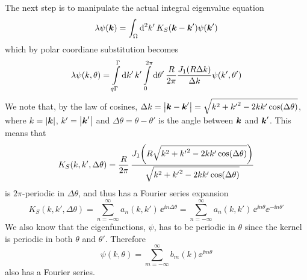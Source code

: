 \documentclass[11pt,a4paper, 
swedish, english %
]{article}
\begin{document}
The next step is to manipulate the actual integral eigenvalue equation
\begin{equation}
\lambda \psi(\vb*k) = \oldint_\Omega \rd^2k'\,
K_S(\vb*k-\vb*k')\psi(\vb*k')
\end{equation}
which by polar coordiane substitution becomes
\begin{equation}\label{eq:eigint-pol}
\lambda\psi(k, \theta) =
\int_{q\Gamma}^\Gamma\rd{k'}\,k'
\int_{0}^{2\pi}\rd\theta'\,\frac{R}{2\pi}
\frac{J_1(R\Delta{k})}{\Delta{k}} \psi(k',\theta')
\end{equation}
We note that, by the law of cosines, 
$\Delta{k}=\abs{\vb*k-\vb*k'}=\sqrt{k^2+{k'}^2-2kk'\cos(\Delta\theta)}$, 
where $k=\abs{\vb*k}$, $k'=\abs{\vb*k'}$ and
$\Delta\theta=\theta-\theta'$ is the angle between $\vb*k$ and
$\vb*k'$. This means that 
\begin{equation}\label{eq:KS-long}
K_S(k, k', \Delta\theta) = \frac{R}{2\pi}\,
\frac{J_1\qty(R\sqrt{k^2+{k'}^2-2kk'\cos(\Delta\theta)})}
{\sqrt{k^2+{k'}^2-2kk'\cos(\Delta\theta)}}
\end{equation}
is $2\pi$-periodic in $\Delta\theta$, and thus has a Fourier series expansion 
\begin{equation} \label{eq:KS-FS}
K_S(k, k', \Delta\theta)  
=\sum_{n=-\infty}^\infty a_{n}(k, k')\, \ee^{\ii n\Delta\theta}
=\sum_{n=-\infty}^\infty a_{n}(k, k')\, \ee^{\ii n\theta}\ee^{-\ii n\theta'}
\end{equation}
We also know that the eigenfunctions, $\psi$, has to be periodic in
$\theta$ since the kernel is periodic in both $\theta$ and
$\theta'$. Therefore 
\begin{equation}\label{eq:psi-FS}
\psi(k, \theta) = \sum_{m=-\infty}^\infty b_m(k)\ee^{\ii m\theta}
\end{equation}
also has a Fourier series. 
\end{document}
